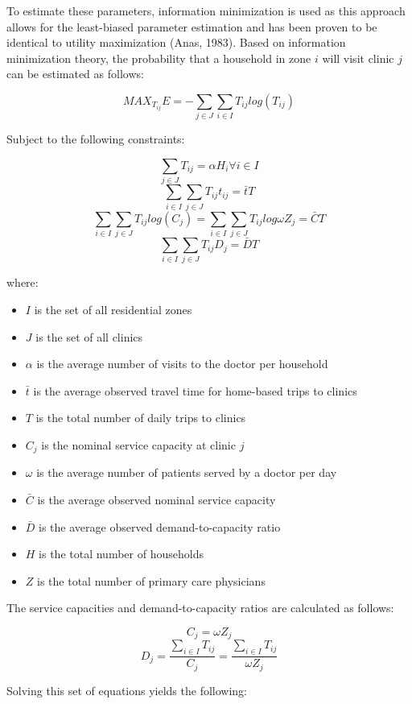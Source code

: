 \documentclass[]{elsarticle} %
\providecommand{\tightlist}{%
  \setlength{\itemsep}{0pt}\setlength{\parskip}{0pt}}
\begin{document}
To estimate these parameters, information minimization is used as this
approach allows for the least-biased parameter estimation and has been
proven to be identical to utility maximization (Anas, 1983). Based on
information minimization theory, the probability that a household in
zone \(i\) will visit clinic \(j\) can be estimated as follows:

\[
MAX_{T_{ij}} E = -\sum_{j \in J} \sum_{i \in I} T_{ij} log(T_{ij})
\]

Subject to the following constraints:

\[
\sum_{j \in J}T_{ij} = \alpha H_i \forall i \in I 
\] \[
\sum_{i \in I} \sum_{j \in J} T_{ij} t_{ij} = \bar{t}T 
\] \[
\sum_{i \in I} \sum_{j \in J} T_{ij} log(C_j) = \sum_{i \in I} \sum_{j \in J}T_{ij} log \omega Z_j = \bar{C}T 
\] \[
\sum_{i \in I} \sum_{j \in J} T_{ij} D_j = \bar{D}T
\]

where:

\begin{itemize}
\tightlist
\item
  \(I\) is the set of all residential zones
\item
  \(J\) is the set of all clinics
\item
  \(\alpha\) is the average number of visits to the doctor per household
\item
  \(\bar{t}\) is the average observed travel time for home-based trips
  to clinics
\item
  \(T\) is the total number of daily trips to clinics
\item
  \(C_j\) is the nominal service capacity at clinic \(j\)
\item
  \(\omega\) is the average number of patients served by a doctor per
  day
\item
  \(\bar{C}\) is the average observed nominal service capacity
\item
  \(\bar{D}\) is the average observed demand-to-capacity ratio
\item
  \(H\) is the total number of households
\item
  \(Z\) is the total number of primary care physicians
\end{itemize}

The service capacities and demand-to-capacity ratios are calculated as
follows:

\[
C_j = \omega Z_j
\] \[
D_j = \frac{\sum_{i \in I} T_{ij}}{C_j} = \frac{\sum_{i \in I} T_{ij}}{\omega Z_j}
\]

Solving this set of equations yields the following:
\end{document}
